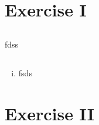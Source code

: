 \documentclass[12pt,twoside]{article}
\begin{document}



\section{Exercise I}
\renewcommand{\thesubsection}{\thesection.\alph{subsection}}
\subsection{}
fdss
\subsection{}
\begin{enumerate}[(ii)]
\item
fsds
\end{enumerate}
\section{Exercise II}
\end{document}
